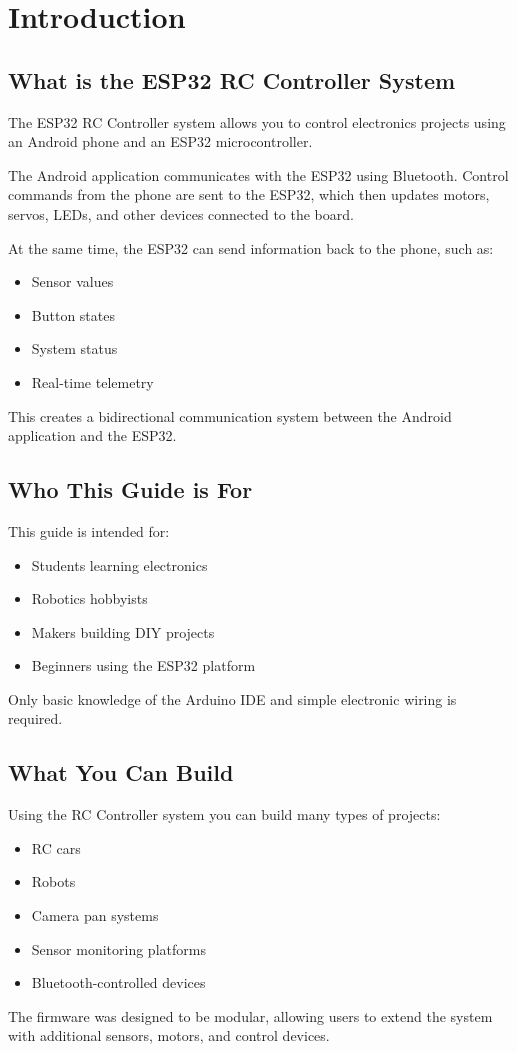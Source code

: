 \chapter{Introduction}

\section{What is the ESP32 RC Controller System}

The ESP32 RC Controller system allows you to control electronics projects using an Android phone and an ESP32 microcontroller.

The Android application communicates with the ESP32 using Bluetooth. Control commands from the phone are sent to the ESP32, which then updates motors, servos, LEDs, and other devices connected to the board.

At the same time, the ESP32 can send information back to the phone, such as:

\begin{itemize}
	\item Sensor values
	\item Button states
	\item System status
	\item Real-time telemetry
\end{itemize}

This creates a bidirectional communication system between the Android application and the ESP32.

\section{Who This Guide is For}

This guide is intended for:

\begin{itemize}
	\item Students learning electronics
	\item Robotics hobbyists
	\item Makers building DIY projects
	\item Beginners using the ESP32 platform
\end{itemize}

Only basic knowledge of the Arduino IDE and simple electronic wiring is required.

\section{What You Can Build}

Using the RC Controller system you can build many types of projects:

\begin{itemize}
	\item RC cars
	\item Robots
	\item Camera pan systems
	\item Sensor monitoring platforms
	\item Bluetooth-controlled devices
\end{itemize}

The firmware was designed to be modular, allowing users to extend the system with additional sensors, motors, and control devices.